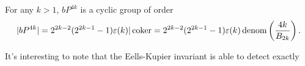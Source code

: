 \begin{theorem}
	For any $k>1$, $bP^{4k}$ is a cyclic group of order
	\[
	|bP^{4k}|=2^{2k-2}(2^{2k-1}-1)\varepsilon(k)|\operatorname{coker} =2^{2k-2}(2^{2k-1}-1)\varepsilon(k)\operatorname{denom}\left(\frac{4k}{B_{2k}}\right).
	\]
\end{theorem}

\begin{remark}
	It's interesting to note that the Eells-Kupier invariant is able to detect exactly
\end{remark}
%
%
%
%
%
%
